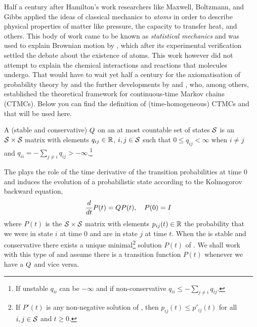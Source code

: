 Half a century after Hamilton's work
researchers like Maxwell, Boltzmann, and Gibbs
applied the ideas of classical mechanics to \emph{atoms}
in order to describe physical properties of matter like pressure,
the capacity to transfer heat, and others.
This body of work came to be known as \emph{statistical mechanics}
and was used to explain Brownian motion by \citet{einstein-brownian},
which after its experimental verification \citep{perrin}
settled the debate about the existence of atoms.
This work however did not attempt to explain
the chemical interactions and reactions that molecules undergo.
That would have to wait yet half a century
for the axiomatisation of probability theory by \citet{kolmogorov}
and the further developments by \citet{doob} and \citet{feller},
who, among others, established the theoretical framework
for continuous-time Markov chains (CTMCs).
Below you can find the definition of (time-homogeneous) CTMCs
and \qmatrices that will be used here.

\begin{definition}%
  A (stable and conservative) \emph{\qmatrix} $Q$
  on an at most countable set of states $\mathcal{S}$
  is an $\mathcal{S} \times \mathcal{S}$ matrix
  with elements $q_{ij} \in \mathbb{R}$, $i,j \in \mathcal{S}$
  such that $0 \leqslant q_{ij} < \infty$ when $i \neq j$
  and $q_{ii} = - \sum_{j \neq i} q_{ij} > -\infty$.\footnote{
    If unstable $q_{ii}$ can be $-\infty$ and if non-conservative
    $q_{ii} \leqslant - \sum_{j \neq i} q_{ij}$.}
\end{definition}

The \qmatrix plays the role of
the time derivative of the transition probabilities at time $0$
and induces the evolution of a probabilistic state
according to the Kolmogorov backward equation,
\begin{equation}
  \label{eq:transition-function}
  \frac{d}{dt} P(t) = Q P(t), \quad P(0) = I
\end{equation}
where $P(t)$ is the $\mathcal{S} \times \mathcal{S}$ matrix
with elements $p_{ij}(t) \in \mathbb{R}$ the probability that
we were in state $i$ at time $0$ and are in state $j$ at time $t$.
When the \qmatrix is stable and conservative
there exists a unique minimal\footnote{
  If $P'(t)$ is any
  non-negative solution of ,
  then $p_{ij}(t) \leqslant p'_{ij}(t)$
  for all $i, j \in \mathcal{S}$ and $t \geqslant 0$.}
solution $P(t)$ of  \citep{anderson}.
We shall work with this type of \qmatrices
and assume there is a transition function $P(t)$
whenever we have a \qmatrix $Q$ and vice versa.

